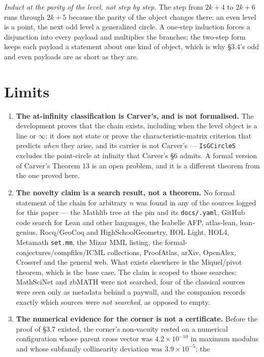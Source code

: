 \documentclass[11pt]{article}
\providecommand{\tightlist}{\setlength{\itemsep}{0pt}\setlength{\parskip}{0pt}}
\theoremstyle{definition}
\theoremstyle{remark}
\begin{document}
\emph{Induct at the parity of the level, not step by step.} The step from \(2k+4\) to \(2k+6\) runs through
\(2k+5\) because the parity of the object changes there: an even level is a point, the next odd level a
generalized circle. A one-step induction forces a disjunction into every payload and multiplies the
branches; the two-step form keeps each payload a statement about one kind of object, which is why \S{}3.4's
odd and even payloads are as short as they are.

\hypertarget{limits}{%
\section{Limits}\label{limits}}

\begin{enumerate}
\def\labelenumi{\arabic{enumi}.}
\tightlist
\item
  \textbf{The at-infinity classification is Carver's, and is not formalised.} The development proves that the
  chain exists, including when the level object is a line or $\infty$; it does not state or prove the
  characteristic-matrix criterion that predicts \emph{when} they arise, and its carrier is not Carver's ---
  \texttt{IsGCircleS} excludes the point-circle at infinity that Carver's \S{}6 admits. A formal version of
  Carver's Theorem 13 is an open problem, and it is a different theorem from the one proved here.
\item
  \textbf{The novelty claim is a search result, not a theorem.} No formal statement of the chain for arbitrary
  \(n\) was found in any of the sources logged for this paper --- the Mathlib tree at the pin and its
  \texttt{docs/.\allowbreak yaml}, GitHub code search for Lean and other languages, the Isabelle AFP, atlas-lean,
  lean-genius, Rocq/GeoCoq and HighSchoolGeometry, HOL Light, HOL4, Metamath \texttt{set.\allowbreak mm}, the Mizar MML
  listing, the formal-conjectures/compfiles/ICML collections, ProofAtlas, arXiv, OpenAlex, Crossref and
  the general web. What exists elsewhere is the Miquel/pivot theorem, which is the base case. The claim is
  scoped to those searches: MathSciNet and zbMATH were not searched, four of the classical sources were
  seen only as metadata behind a paywall, and the companion records exactly which sources were \emph{not
  searched}, as opposed to empty.
\item
  \textbf{The numerical evidence for the corner is not a certificate.} Before the proof of \S{}3.7 existed, the
  corner's non-vacuity rested on a numerical configuration whose parent cross vector was \(4.2 \times 10^{-10}\) in maximum modulus and whose subfamily collinearity deviation was \(3.9 \times 10^{-5}\); the

\end{enumerate}
\end{document}
